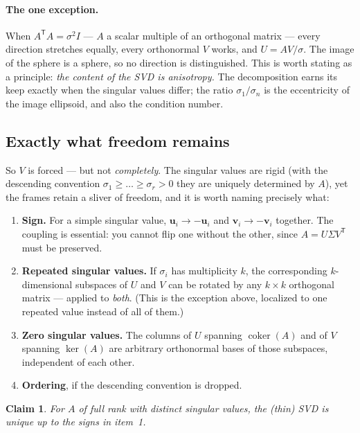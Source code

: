 \documentclass[11pt]{article}
\numberwithin{equation}{section}
\newcommand{\T}{^{\mathsf{T}}}
\newcommand{\vv}[1]{\mathbf{v}_{#1}}
\newcommand{\uu}[1]{\mathbf{u}_{#1}}
\theoremstyle{plainish}
\newtheorem*{claim}{Claim}
\begin{document}
\paragraph{The one exception.} When $A\T A = \sigma^2 I$ --- $A$ a scalar
multiple of an orthogonal matrix --- every direction stretches equally, every
orthonormal $V$ works, and $U = AV/\sigma$. The image of the sphere is a sphere,
so no direction is distinguished. This is worth stating as a principle:
\emph{the content of the SVD is anisotropy.} The decomposition earns its keep
exactly when the singular values differ; the ratio $\sigma_1/\sigma_n$ is the
eccentricity of the image ellipsoid, and also the condition number.

\subsection*{Exactly what freedom remains}

So $V$ is forced --- but not \emph{completely}. The singular values are rigid
(with the descending convention $\sigma_1 \geq \dots \geq \sigma_r > 0$ they are
uniquely determined by $A$), yet the frames retain a sliver of freedom, and it
is worth naming precisely what:

\begin{enumerate}\itemsep0.3em
\item \textbf{Sign.} For a simple singular value, $\uu i \to -\uu i$ and
$\vv i \to -\vv i$ together. The coupling is essential: you cannot flip one
without the other, since $A = U\Sigma V\T$ must be preserved.
\item \textbf{Repeated singular values.} If $\sigma_i$ has multiplicity $k$,
the corresponding $k$-dimensional subspaces of $U$ and $V$ can be rotated by
any $k \times k$ orthogonal matrix --- applied to \emph{both}. (This is the
exception above, localized to one repeated value instead of all of them.)
\item \textbf{Zero singular values.} The columns of $U$ spanning
$\operatorname{coker}(A)$ and of $V$ spanning $\ker(A)$ are arbitrary
orthonormal bases of those subspaces, independent of each other.
\item \textbf{Ordering}, if the descending convention is dropped.
\end{enumerate}

\begin{claim}
For $A$ of full rank with distinct singular values, the (thin) SVD is unique up
to the signs in item~1.
\end{claim}
\end{document}
